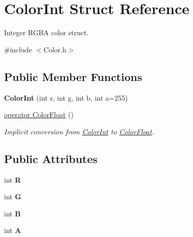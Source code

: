 \hypertarget{struct_color_int}{\section{Color\+Int Struct Reference}
\label{struct_color_int}
}


Integer R\+G\+B\+A color struct.  




{\ttfamily \#include $<$Color.\+h$>$}

\subsection*{Public Member Functions}
\begin{DoxyCompactItemize}
\item 
\hypertarget{struct_color_int_ad9eef03a92353332dc3c46cb1ba5071d}{{\bfseries Color\+Int} (int r, int g, int b, int a=255)}\label{struct_color_int_ad9eef03a92353332dc3c46cb1ba5071d}

\item 
\hyperlink{struct_color_int_a7a0bec01fc87ef256cd15bd2e51f55ff}{operator Color\+Float} ()
\begin{DoxyCompactList}\small\item\em Implicit conversion from \hyperlink{struct_color_int}{Color\+Int} to \hyperlink{struct_color_float}{Color\+Float}. \end{DoxyCompactList}\end{DoxyCompactItemize}
\subsection*{Public Attributes}
\begin{DoxyCompactItemize}
\item 
\hypertarget{struct_color_int_a49487fa834ef54da91085bb0346109da}{int {\bfseries R}}\label{struct_color_int_a49487fa834ef54da91085bb0346109da}

\item 
\hypertarget{struct_color_int_aa0b690191e8267e2699561b8526e04c9}{int {\bfseries G}}\label{struct_color_int_aa0b690191e8267e2699561b8526e04c9}

\item 
\hypertarget{struct_color_int_a49ef255f3a8e47b3a1b990eace30e894}{int {\bfseries B}}\label{struct_color_int_a49ef255f3a8e47b3a1b990eace30e894}

\item 
\hypertarget{struct_color_int_a5f3064ef16e526140807800b86affd18}{int {\bfseries A}}\label{struct_color_int_a5f3064ef16e526140807800b86affd18}

\end{DoxyCompactItemize}


